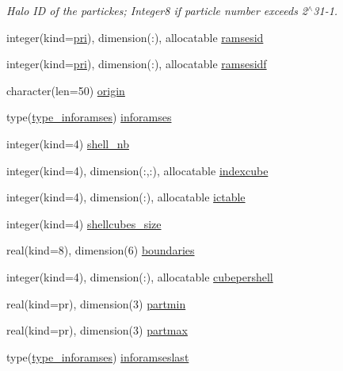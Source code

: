 \begin{DoxyCompactItemize}
\begin{DoxyCompactList}\small\item\em Halo ID of the partickes; Integer8 if particle number exceeds 2$^\wedge$31-\/1. \end{DoxyCompactList}\item 
integer(kind=\hyperlink{namespacemodvariables_a51e0b900e05f4302a36ddf33b6df0649}{pri}), dimension(\+:), allocatable \hyperlink{namespacemodvariables_ae6b45a68a4cbf0ccbbf7c08ee87e3573}{ramsesid}
\item 
integer(kind=\hyperlink{namespacemodvariables_a51e0b900e05f4302a36ddf33b6df0649}{pri}), dimension(\+:), allocatable \hyperlink{namespacemodvariables_a960cf3d5497024438caba54185cd7793}{ramsesidf}
\item 
character(len=50) \hyperlink{namespacemodvariables_a9f9928f8307cdd707b3a7d360a992f9f}{origin}
\item 
type(\hyperlink{structmodconstant_1_1type__inforamses}{type\+\_\+inforamses}) \hyperlink{namespacemodvariables_ac84b14c43266126c4d7120ba0b8f48f4}{inforamses}
\item 
integer(kind=4) \hyperlink{namespacemodvariables_a8e749d6e70dade5cb6d75a09a99cefd7}{shell\+\_\+nb}
\item 
integer(kind=4), dimension(\+:,\+:), allocatable \hyperlink{namespacemodvariables_a46e17f78883958892917ac536b4ab1b1}{indexcube}
\item 
integer(kind=4), dimension(\+:), allocatable \hyperlink{namespacemodvariables_a2de620524061386e6addabfa15a6b020}{ictable}
\item 
integer(kind=4) \hyperlink{namespacemodvariables_a9b7ba2cda6114449e99e9f7f348d4c32}{shellcubes\+\_\+size}
\item 
real(kind=8), dimension(6) \hyperlink{namespacemodvariables_a0dd99db73cadd4dfd2c39cdc09b6da9b}{boundaries}
\item 
integer(kind=4), dimension(\+:), allocatable \hyperlink{namespacemodvariables_a2c3c2168db3dc7c7b511d9c5a2715de5}{cubepershell}
\item 
real(kind=pr), dimension(3) \hyperlink{namespacemodvariables_a70ddcf7f533c219df5c249774ff81df1}{partmin}
\item 
real(kind=pr), dimension(3) \hyperlink{namespacemodvariables_abeabad3e2598f3abb4a4fa74adca7743}{partmax}
\item 
type(\hyperlink{structmodconstant_1_1type__inforamses}{type\+\_\+inforamses}) \hyperlink{namespacemodvariables_a0640750979390f0e918c322d27b0bf74}{inforamseslast}
\item 

\end{DoxyCompactItemize}
